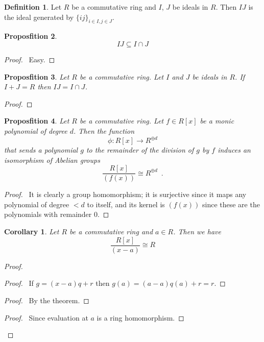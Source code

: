 \documentclass{book}
\let\qed\relax
\newtheorem{prop}{Proposfition}[chapter]
\newtheorem{cor}{Corollary}[prop]
\theoremstyle{definition}
\newtheorem{df}[prop]{Definition}
\begin{document}
\begin{df}
Let $R$ be a commutative ring and $I$, $J$ be ideals in $R$. Then $IJ$ is the ideal generated by $\{ ij \}_{i \in I, j \in J}$.
\end{df}

\begin{prop}
\[ IJ \subseteq I \cap J \]
\end{prop}

\begin{proof}
\pf\ Easy. \qed
\end{proof}

\begin{prop}
Let $R$ be a commutative ring. Let $I$ and $J$ be ideals in $R$. If $I + J = R$ then $IJ = I \cap J$.
\end{prop}

\begin{proof}
\pf
{}
\qed
\end{proof}

\begin{prop}
Let $R$ be a commutative ring. Let $f \in R[x]$ be a monic polynomial of degree $d$. Then the function
\[ \phi : R[x] \rightarrow R^{\oplus d} \]
that sends a polynomial $g$ to the remainder of the division of $g$ by $f$ induces an isomorphism of Abelian groups
\[ \frac{R[x]}{(f(x))} \cong R^{\oplus d} \enspace . \]
\end{prop}

\begin{proof}
\pf\ It is clearly a group homomorphism; it is surjective since it maps any polynomial of degree $< d$ to itself, and its kernel is $(f(x))$ since these are the polynomials with remainder 0. \qed
\end{proof}

\begin{cor}
Let $R$ be a commutative ring and $a \in R$. Then we have
\[ \frac{R[x]}{(x-a)} \cong R \]
\end{cor}

\begin{proof}
\pf
{}
\begin{proof}
\pf\ If $g = (x-a)q + r$ then $g(a) = (a-a)q(a) + r = r$.
\end{proof}
\begin{proof}
\pf\ By the theorem.
\end{proof}
\begin{proof}
\pf\ Since evaluation at $a$ is a ring homomorphism.
\end{proof}
\qed
\end{proof}
\end{document}
